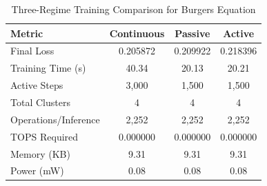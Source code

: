 \begin{table}[htbp]
\centering
\caption{Three-Regime Training Comparison for Burgers Equation}
\label{tab:three_regime_comparison}
\begin{tabular}{l|ccc}
\hline
\textbf{Metric} & \textbf{Continuous} & \textbf{Passive} & \textbf{Active} \\
\hline
Final Loss & 0.205872 & 0.209922 & 0.218396 \\
Training Time (s) & 40.34 & 20.13 & 20.21 \\
Active Steps & 3,000 & 1,500 & 1,500 \\
Total Clusters & 4 & 4 & 4 \\
Operations/Inference & 2,252 & 2,252 & 2,252 \\
TOPS Required & 0.000000 & 0.000000 & 0.000000 \\
Memory (KB) & 9.31 & 9.31 & 9.31 \\
Power (mW) & 0.08 & 0.08 & 0.08 \\
\hline
\end{tabular}
\end{table}
